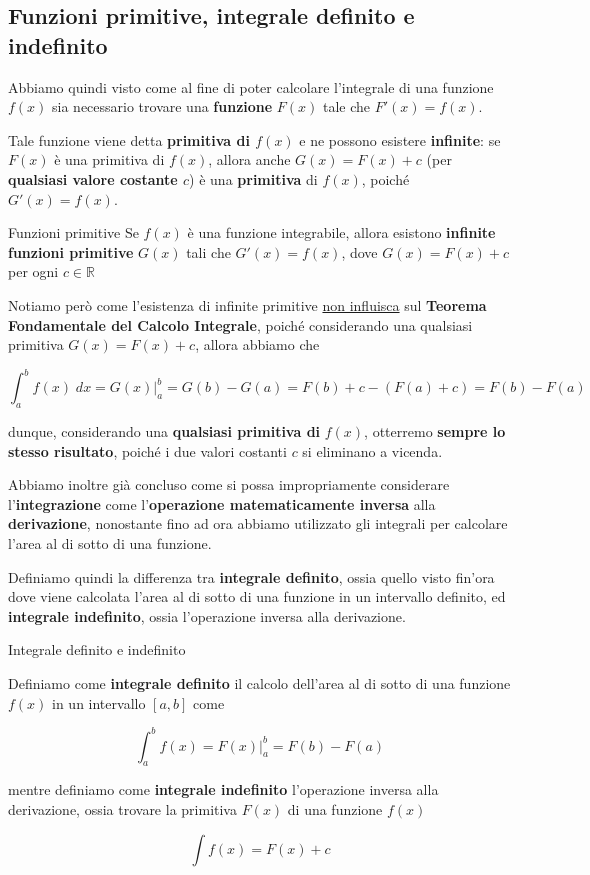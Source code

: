 \documentclass[a4paper, 12pt]{report}
\begin{document}
    \subsection{Funzioni primitive, integrale definito e indefinito}
    
    Abbiamo quindi visto come al fine di poter calcolare l'integrale di una funzione $f(x)$ sia necessario trovare una \textbf{funzione} $F(x)$ tale che $F'(x) = f(x)$.
    
    Tale funzione viene detta \textbf{primitiva di $f(x)$} e ne possono esistere \textbf{infinite}: se $F(x)$ è una primitiva di $f(x)$, allora anche $G(x) = F(x) + c$ (per \textbf{qualsiasi valore costante $c$}) è una \textbf{primitiva} di $f(x)$, poiché $G'(x) = f(x)$.
    
    \begin{framedprop}{Funzioni primitive}
        Se $f(x)$ è una funzione integrabile, allora esistono \textbf{infinite funzioni primitive} $G(x)$ tali che $G'(x) = f(x)$, dove $G(x) = F(x) + c$ per ogni $c \in \mathbb{R}$
    \end{framedprop}
    
    Notiamo però come l'esistenza di infinite primitive \underline{non influisca} sul \textbf{Teorema Fondamentale del Calcolo Integrale}, poiché considerando una qualsiasi primitiva $G(x) = F(x) + c$, allora abbiamo che
    
    \[ \int_{a}^{b} f(x) \; dx = \left . G(x) \right |_{a}^{b} = G(b) - G(a) = F(b) + c - (F(a) + c) = F(b) - F(a)\]
    
    dunque, considerando una \textbf{qualsiasi primitiva di} $f(x)$, otterremo \textbf{sempre lo stesso risultato}, poiché i due valori costanti $c$ si eliminano a vicenda.
    
    Abbiamo inoltre già concluso come si possa impropriamente considerare l'\textbf{integrazione} come l'\textbf{operazione matematicamente inversa} alla \textbf{derivazione}, nonostante fino ad ora abbiamo utilizzato gli integrali per calcolare l'area al di sotto di una funzione.
    
    Definiamo quindi la differenza tra \textbf{integrale definito}, ossia quello visto fin'ora dove viene calcolata l'area al di sotto di una funzione in un intervallo definito, ed \textbf{integrale indefinito}, ossia l'operazione inversa alla derivazione.
    
    \begin{framedprop}{Integrale definito e indefinito}
    
        Definiamo come \textbf{integrale definito} il calcolo dell'area al di sotto di una funzione $f(x)$ in un intervallo $[a,b]$ come
        
        \[ \int_{a}^{b} f(x) = \left . F(x) \right |_{a}^{b} = F(b) - F(a) \]
        
        mentre definiamo come \textbf{integrale indefinito} l'operazione inversa alla derivazione, ossia trovare la primitiva $F(x)$ di una funzione $f(x)$
        
        \[ \int f(x) = F(x) + c\]
    \end{framedprop}
    
\end{document}

